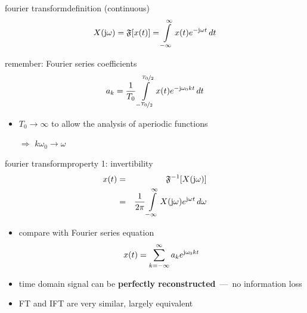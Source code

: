         \begin{frame}{fourier transform}{definition (continuous)}
            \begin {equation*}\label{eq:fourier_transformation}
                X(\mathrm{j}\omega) = \mathfrak{F}[x(t)] = \int\limits_{-\infty}^{\infty} {x(t) {e}^{-\mathrm{j}\omega t}\, dt}
            \end {equation*}

            \pause
            remember: Fourier series coefficients 
            \begin {equation*}\label{eq:fourier_coeff}
                a_k = \frac{1}{T_0}\int\limits_{-\nicefrac{T_0}{2}}^{\nicefrac{T_0}{2}} x(t) {e}^{-\mathrm{j}\omega_0kt}\, dt \nonumber
            \end {equation*}
            
            \begin{itemize}
                \item	$T_0\rightarrow \infty$ to allow the analysis of aperiodic functions
                \item[$\Rightarrow$] $k\omega_0 \rightarrow \omega$
            \end{itemize}
        \end{frame}	

        \begin{frame}{fourier transform}{property 1: invertibility}
            \begin{eqnarray*}\label{eq:ift}
                x(t) &=& \mathfrak{F}^{-1}[X(\mathrm{j}\omega)]\nonumber\\
                 &=& \frac{1}{2\pi}\int\limits_{-\infty}^{\infty} X(\mathrm{j}\omega) {e}^{\mathrm{j}\omega t}\, d\omega 
            \end{eqnarray*}

            \begin{itemize}
                \item<2->   compare with Fourier series equation
                    \begin {equation*}
                        x(t) = \sum\limits_{k=-\infty}^{\infty} a_k {e}^{\mathrm{j}\omega_0 k t} \nonumber
                    \end {equation*}
                \item<3->   time domain signal can be \textbf{perfectly reconstructed}~---~no information loss
                \item<3->   FT and IFT are very similar, largely equivalent
            \end{itemize}
        \end{frame}	

